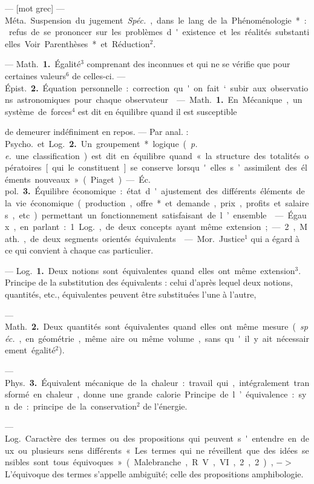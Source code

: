 \begin{itemize}[leftmargin=1cm, label=, itemsep=1pt]
 — [mot grec] — \si{Méta.} Suspension du jugement. {\it Spéc.}, dans le
lang. de la Phénoménologie* : refus
de se prononcer sur les problèmes
d'existence et les réalités substantielles. Voir Parenthèses* et Réduction$^2$.

 — \si{Math.} {\bf 1.} Égalité$^3$ comprenant des inconnues et qui ne se
vérifie que pour certaines valeurs$^6$
de celles-ci. — \si{Épist.} {\bf 2.} Équation
personnelle : correction qu'on fait
‘subir aux observations astronomiques pour chaque observateur.

 — \si{Math.} {\bf 1.} En Mécanique,
un système de forces$^4$ est dit en
équilibre quand il est susceptible

de demeurer indéfiniment en repos.
— Par anal. : \si{Psycho.} et \si{Log.} {\bf 2.} Un
groupement* logique ({\it p. e.} une classification) est dit en équilibre quand
« la structure des totalités opératoires [qui le constituent] se conserve lorsqu'elles s’assimilent des
éléments nouveaux » (Piaget). —
\si{Éc. pol.} {\bf 3.} Équilibre économique :
état d'ajustement des différents éléments de la vie économique (production, offre* et demande, prix,
profits et salaires, etc.) permettant
un fonctionnement satisfaisant de
l’ensemble.

 — Égaux, en parlant :
1. \si{Log.}, de deux concepts ayant
même extension ; — 2, \si{Math.}, de
deux segments orientés équivalents.

 — \si{Mor.} Justice$^1$ qui a égard
à ce qui convient à chaque cas particulier.

 — \si{Log.} {\bf 1.} Deux notions
sont équivalentes quand elles ont
même extension$^3$. Principe de la
substitution des équivalents : celui
d’après lequel deux notions, quantités, etc., équivalentes peuvent être
substituées l’une à l’autre,

— \si{Math.} {\bf 2.} Deux quantités sont
équivalentes quand elles ont même
mesure ({\it spéc.}, en géométrie, même
aire ou même volume, sans qu'il y
ait nécessairement égalité$^2$).

— \si{Phys.} {\bf 3.} Équivalent mécanique
de la chaleur : travail qui, intégralement transformé en chaleur, donne
une grande calorie. Principe de
l’équivalence : syn. de : principe de
la conservation$^2$ de l’énergie.

 — \si{Log.} Caractère des
termes ou des propositions qui peuvent s'entendre en deux ou plusieurs
sens différents « Les termes qui ne
réveillent que des idées sensibles
sont tous équivoques » (Malebranche, R. V., VI, 2, 2), $->$
L'équivoque des termes s'appelle
ambiguïté; celle des propositions
amphibologie.


\end{itemize}
